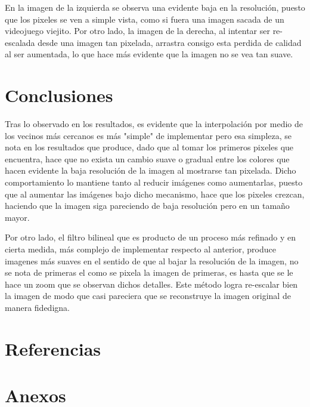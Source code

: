\documentclass[11pt, letterpaper]{article}
\begin{document}
	En la imagen de la izquierda se observa una evidente baja en la resolución, puesto que los pixeles se ven a simple vista, como si fuera una imagen sacada de un videojuego viejito. Por otro lado, la imagen de la derecha, al intentar ser re-escalada desde una imagen tan pixelada, arrastra consigo esta perdida de calidad al ser aumentada, lo que hace más evidente que la imagen no se vea tan suave.
	

	\newpage

	
	\section{Conclusiones}
	
	Tras lo observado en los resultados, es evidente que la interpolación por medio de los vecinos más cercanos es más "simple" de implementar pero esa simpleza, se nota en los resultados que produce, dado que al tomar los primeros pixeles que encuentra, hace que no exista un cambio suave o gradual entre los colores que hacen evidente la baja resolución de la imagen al mostrarse tan pixelada. Dicho comportamiento lo mantiene tanto al reducir imágenes como aumentarlas, puesto que al aumentar las imágenes bajo dicho mecanismo, hace que los pixeles crezcan, haciendo que la imagen siga pareciendo de baja resolución pero en un tamaño mayor.
	
	Por otro lado, el filtro bilineal que es producto de un proceso más refinado y en cierta medida, más complejo de implementar respecto al anterior, produce imagenes más suaves en el sentido de que al bajar la resolución de la imagen, no se nota de primeras el como se pixela la imagen de primeras, es hasta que se le hace un zoom que se observan dichos detalles. Este método logra re-escalar bien la imagen de modo que casi pareciera que se reconstruye la imagen original de manera fidedigna.

	\newpage

	
\section{Referencias}  %


	\newpage
	
	\section{Anexos}
\end{document}
